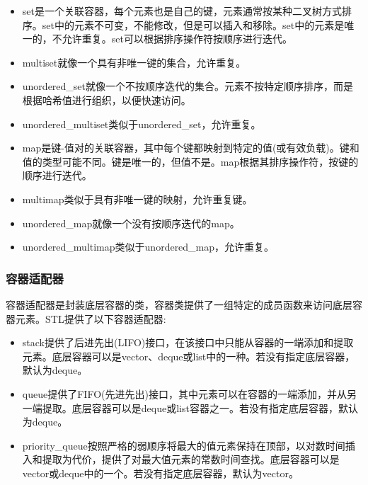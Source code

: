 \begin{itemize}
\item 
set是一个关联容器，每个元素也是自己的键，元素通常按某种二叉树方式排序。set中的元素不可变，不能修改，但是可以插入和移除。set中的元素是唯一的，不允许重复。set可以根据排序操作符按顺序进行迭代。

\item 
multiset就像一个具有非唯一键的集合，允许重复。

\item 
unordered\_set就像一个不按顺序迭代的集合。元素不按特定顺序排序，而是根据哈希值进行组织，以便快速访问。

\item 
unordered\_multiset类似于unordered\_set，允许重复。

\item 
map是键-值对的关联容器，其中每个键都映射到特定的值(或有效负载)。键和值的类型可能不同。键是唯一的，但值不是。map根据其排序操作符，按键的顺序进行迭代。

\item 
multimap类似于具有非唯一键的映射，允许重复键。

\item 
unordered\_map就像一个没有按顺序迭代的map。

\item 
unordered\_multimap类似于unordered\_map，允许重复。
\end{itemize}

\subsubsection{容器适配器}

容器适配器是封装底层容器的类，容器类提供了一组特定的成员函数来访问底层容器元素。STL提供了以下容器适配器:

\begin{itemize}
\item 
stack提供了后进先出(LIFO)接口，在该接口中只能从容器的一端添加和提取元素。底层容器可以是vector、deque或list中的一种。若没有指定底层容器，默认为deque。

\item 
queue提供了FIFO(先进先出)接口，其中元素可以在容器的一端添加，并从另一端提取。底层容器可以是deque或list容器之一。若没有指定底层容器，默认为deque。

\item 
priority\_queue按照严格的弱顺序将最大的值元素保持在顶部，以对数时间插入和提取为代价，提供了对最大值元素的常数时间查找。底层容器可以是vector或deque中的一个。若没有指定底层容器，默认为vector。
\end{itemize}

